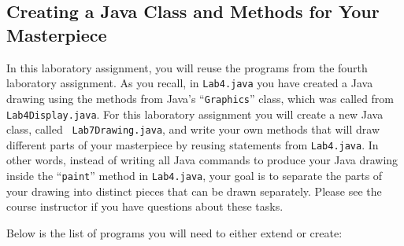 \vspace{-0.2in}
\subsection*{Creating a Java Class and Methods for Your Masterpiece}
\vspace{-0.05in}

\noindent In this laboratory assignment, you will reuse the programs from the fourth laboratory assignment. As you
recall, in {\tt Lab4.java} you have created a Java drawing using the methods from Java's ``{\tt Graphics}'' class, which
was called from {\tt Lab4Display.java}. For this laboratory assignment you will create a new Java class, called {\tt
Lab7Drawing.java}, and write your own methods that will draw different parts of your masterpiece by reusing statements
from {\tt Lab4.java}. In other words, instead of writing all Java commands to produce your Java drawing inside the
``{\tt paint}'' method in {\tt Lab4.java}, your goal is to separate the parts of your drawing into  distinct pieces that
can be drawn separately. Please see the course instructor if you have questions about these tasks.

\noindent Below is the list of programs you will need to either extend or create:

